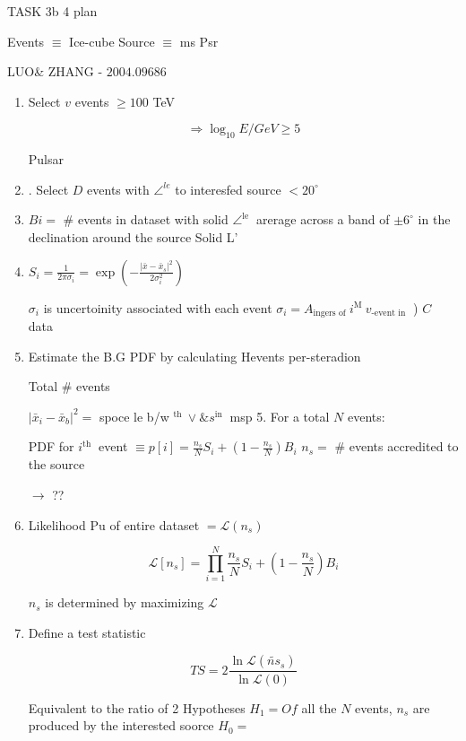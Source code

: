 \documentclass[journal,12pt,twocolumn]{IEEEtran}
\begin{document}
TASK 3b 4 plan

Events $\equiv$ Ice-cube \quad Source $\equiv$ ms Psr

LUO\& ZHANG - $2004.09686$

\begin{enumerate}

\item  Select $v$ events $\geqslant 100$ TeV

$$
\Rightarrow \log _{10} E / GeV \geqslant 5
$$

Pulsar

\item . Select $D$ events with $\angle^{le}$ to interesfed source $<20^{\circ}$

\item  $B i=$ # events in dataset with solid $\angle^{\text {le }}$ arerage across a band of $\pm 6^{\circ}$ in the declination around the source Solid L'

\item  $S_{i}=\frac{1}{2 \pi \sigma_{i}}=\exp \left(-\frac{\left|\bar{x}-\bar{x}_{s}\right|^{2}}{2 \sigma_{i}^{2}}\right)$

$\sigma_{i}$ is uncertoinity associated with each event $\sigma_{i}=A_{\text {ingers of }} i^{\text {M }} v_{\text {-event in }}$ ) $C$ data

\item  Estimate the B.G PDF by calculating Hevents per-steradion

Total # events

$\left|\bar{x}_{i}-\bar{x}_{b}\right|^{2}=$ spoce le b/w $^{\text {th }} \vee \& s^{\text {in }}$ msp 5. For a total $N$ events:

PDF for $i^{\text {th }}$ event $\equiv p[i]=\frac{n_{s}}{N} S_{i}+\left(1-\frac{n_{s}}{N}\right) B_{i}$ $n_{s}=$ # events accredited to the source

$\longrightarrow$ ??

\item  Likelihood Pu of entire dataset $=\mathcal{L}\left(n_{s}\right)$

$$
\mathcal{L}\left[n_{s}\right]=\prod_{i=1}^{N} \frac{n_{s}}{N} S_{i}+\left(1-\frac{n_{s}}{N}\right) B_{i}
$$

$n_{s}$ is determined by maximizing $\mathcal{L}$

\item  Define a test statistic


$$
T S=2 \frac{\ln \mathcal{L}\left(\tilde{n s}_{s}\right)}{\ln \mathcal{L}(0)}
$$

Equivalent to the ratio of 2 Hypotheses $H_{1}=O f$ all the $N$ events, $n_{s}$ are produced by the interested soorce $H_{0}=$
\end{enumerate}
\end{document}
